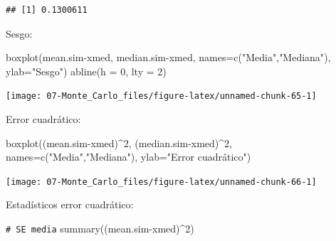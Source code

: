 \documentclass[
]{book}
\newenvironment{Shaded}{\begin{snugshade}}{\end{snugshade}}
\newcommand{\AttributeTok}[1]{\textcolor[rgb]{0.77,0.63,0.00}{#1}}
\newcommand{\CommentTok}[1]{\textcolor[rgb]{0.56,0.35,0.01}{\textit{#1}}}
\newcommand{\DecValTok}[1]{\textcolor[rgb]{0.00,0.00,0.81}{#1}}
\newcommand{\FunctionTok}[1]{\textcolor[rgb]{0.00,0.00,0.00}{#1}}
\newcommand{\NormalTok}[1]{#1}
\newcommand{\SpecialCharTok}[1]{\textcolor[rgb]{0.00,0.00,0.00}{#1}}
\newcommand{\StringTok}[1]{\textcolor[rgb]{0.31,0.60,0.02}{#1}}
\theoremstyle{break}
\theoremstyle{nonumberplain}
\renewcommand{\CommentTok}[1]{\textcolor[rgb]{0.41,0.41,0.41}{\texttt{#1}}}
\begin{document}
\begin{enumerate}
\begin{verbatim}
## [1] 0.1300611
\end{verbatim}

  Sesgo:

\begin{Shaded}
\begin{Highlighting}[]
\FunctionTok{boxplot}\NormalTok{(mean.sim}\SpecialCharTok{{-}}\NormalTok{xmed, median.sim}\SpecialCharTok{{-}}\NormalTok{xmed, }
      \AttributeTok{names=}\FunctionTok{c}\NormalTok{(}\StringTok{"Media"}\NormalTok{,}\StringTok{"Mediana"}\NormalTok{), }\AttributeTok{ylab=}\StringTok{"Sesgo"}\NormalTok{)}
\FunctionTok{abline}\NormalTok{(}\AttributeTok{h =} \DecValTok{0}\NormalTok{, }\AttributeTok{lty =} \DecValTok{2}\NormalTok{)}
\end{Highlighting}
\end{Shaded}

  \begin{center}\texttt{[image: 07-Monte\_Carlo\_files/figure-latex/unnamed-chunk-65-1]} \end{center}

  Error cuadrático:

\begin{Shaded}
\begin{Highlighting}[]
\FunctionTok{boxplot}\NormalTok{((mean.sim}\SpecialCharTok{{-}}\NormalTok{xmed)}\SpecialCharTok{\^{}}\DecValTok{2}\NormalTok{, (median.sim}\SpecialCharTok{{-}}\NormalTok{xmed)}\SpecialCharTok{\^{}}\DecValTok{2}\NormalTok{, }
      \AttributeTok{names=}\FunctionTok{c}\NormalTok{(}\StringTok{"Media"}\NormalTok{,}\StringTok{"Mediana"}\NormalTok{), }\AttributeTok{ylab=}\StringTok{"Error cuadrático"}\NormalTok{)}
\end{Highlighting}
\end{Shaded}

  \begin{center}\texttt{[image: 07-Monte\_Carlo\_files/figure-latex/unnamed-chunk-66-1]} \end{center}

  Estadísticos error cuadrático:

\begin{Shaded}
\begin{Highlighting}[]
\CommentTok{\# SE media}
\FunctionTok{summary}\NormalTok{((mean.sim}\SpecialCharTok{{-}}\NormalTok{xmed)}\SpecialCharTok{\^{}}\DecValTok{2}\NormalTok{) }
\end{Highlighting}
\end{Shaded}


\end{enumerate}
\end{document}
